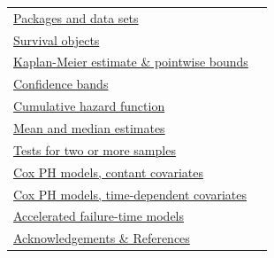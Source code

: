 \documentclass[11pt]{article}
\begin{document}
\begin{tabular}{l r}
\hyperref[packagesAndData]{Packages and data sets} &
	\hyperref[packagesAndData]{\pageref*{packagesAndData}} \\
\hyperref[survObjects]{Survival objects} &
	\hyperref[survObjects]{\pageref*{survObjects}} \\
\hyperref[kapMeiEstimateAndBounds]{Kaplan-Meier estimate \& pointwise bounds} &
	\hyperref[kapMeiEstimateAndBounds]{\pageref*{kapMeiEstimateAndBounds}} \\
\hyperref[confBands]{Confidence bands} &
	\hyperref[confBands]{\pageref*{confBands}} \\
\hyperref[cumulativeHazard]{Cumulative hazard function} &
	\hyperref[cumulativeHazard]{\pageref*{cumulativeHazard}} \\
\hyperref[meanAndMedianEstimates]{Mean and median estimates} &
	\hyperref[meanAndMedianEstimates]{\pageref*{meanAndMedianEstimates}} \\
\hyperref[testsForTwoOrMoreSamples]{Tests for two or more samples} &
	\hyperref[testsForTwoOrMoreSamples]{\pageref*{testsForTwoOrMoreSamples}} \\
\hyperref[coxPHConstCov]{Cox PH models, contant covariates} &
	\hyperref[coxPHConstCov]{\pageref*{coxPHConstCov}} \\
\hyperref[coxPHTimeDepCov]{Cox PH models, time-dependent covariates} \hspace{15mm} &
	\hyperref[coxPHTimeDepCov]{\pageref*{coxPHTimeDepCov}} \\
\hyperref[accFailureTimeModels]{Accelerated failure-time models} &
	\hyperref[accFailureTimeModels]{\pageref*{accFailureTimeModels}}  \\
\hyperref[references]{Acknowledgements \& References} &
	\hyperref[references]{\pageref*{references}}
\end{tabular}

\pagebreak

\label{packagesAndData}
\end{document}
